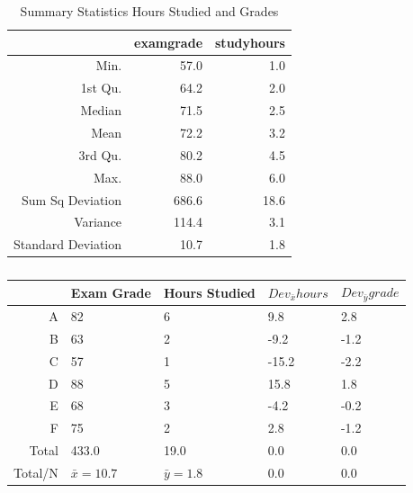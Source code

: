 \documentclass[nohyper,justified]{tufte-handout}\usepackage[]{graphicx}\usepackage[]{color}
\newcommand{\dev}[1] {Dev_{\bar{#1}}}
\begin{document}
\begin{table}[ht]
\centering
\begin{tabular}{rrr}
  \hline
 & examgrade & studyhours \\ 
  \hline
Min. & 57.0 & 1.0 \\ 
  1st Qu. & 64.2 & 2.0 \\ 
  Median & 71.5 & 2.5 \\ 
  Mean & 72.2 & 3.2 \\ 
  3rd Qu. & 80.2 & 4.5 \\ 
  Max. & 88.0 & 6.0 \\ 
  Sum Sq Deviation & 686.6 & 18.6 \\ 
  Variance & 114.4 & 3.1 \\ 
  Standard Deviation & 10.7 & 1.8 \\ 
   \hline
\end{tabular}
\caption{Summary Statistics Hours Studied and Grades} 
\end{table}


\begin{table}[ht]
\centering
\begin{tabular}{rp{1.5cm}p{1.5cm}p{1.5cm}p{1.5cm}}
  \toprule
 & Exam Grade & Hours Studied & $\dev{x} hours$ & $\dev{y} grade$ \\ 
  \midrule
A & 82 & 6 & 9.8 & 2.8 \\ 
   \rowcolor[gray]{0.95}B & 63 & 2 & -9.2 & -1.2 \\ 
  C & 57 & 1 & -15.2 & -2.2 \\ 
   \rowcolor[gray]{0.95}D & 88 & 5 & 15.8 & 1.8 \\ 
  E & 68 & 3 & -4.2 & -0.2 \\ 
   \rowcolor[gray]{0.95}F & 75 & 2 & 2.8 & -1.2 \\ 
   \bottomrule
Total & 433.0& 19.0&  0.0&  0.0  \\ 
\rowcolor[gray]{0.95}Total/N &  $\bar{x}=10.7$ & $\bar{y}= 1.8$ & 0.0 &  0.0  \\ 
\end{tabular}
\caption{} 
\end{table}
\end{document}
